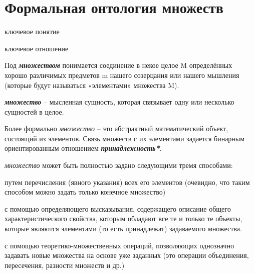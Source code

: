 \section{Формальная онтология множеств}
\label{sec_top_ontologies_set}

\begin{SCn}
\begin{scnrelfromlist}{ключевое понятие}
\end{scnrelfromlist}

\begin{scnrelfromlist}{ключевое отношение}
\end{scnrelfromlist}
\end{SCn}

Под \textbf{\textit{множеством}} понимается соединение в некое целое M определённых хорошо различимых предметов m нашего созерцания или нашего мышления (которые будут называться «элементами» множества M). 

\textbf{\textit{множество}} – мысленная сущность, которая связывает одну или несколько сущностей в целое.

Более формально \textit{множество} – это абстрактный математический объект, состоящий из элементов. Связь множеств с их элементами задается бинарным ориентированным отношением \textbf{\textit{принадлежность*}}.

\textit{множество} может быть полностью задано следующими тремя способами:

\begin{textitemize}
	\item путем перечисления (явного указания) всех его элементов (очевидно, что таким способом можно задать только конечное множество)
	\item с помощью определяющего высказывания, содержащего описание общего характеристического свойства, которым обладают все те и только те объекты, которые являются элементами (то есть принадлежат) задаваемого множества.
	\item с помощью теоретико-множественных операций, позволяющих однозначно задавать новые множества на основе уже заданных (это операции объединения, пересечения, разности множеств и др.)
\end{textitemize}

